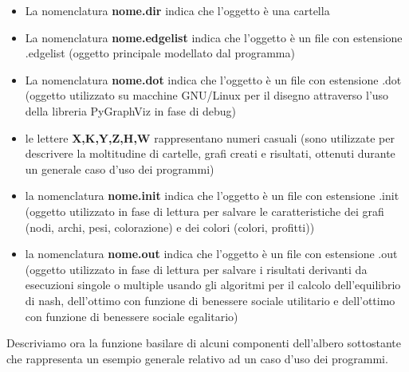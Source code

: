 \begin{itemize}
	\item La nomenclatura \textbf{nome.dir} indica che l'oggetto è una cartella
	\item La nomenclatura \textbf{nome.edgelist} indica che l'oggetto è un file con estensione .edgelist (oggetto principale modellato dal programma)
	\item La nomenclatura \textbf{nome.dot} indica che l'oggetto è un file con estensione .dot (oggetto utilizzato su macchine GNU/Linux per il disegno attraverso l'uso della libreria PyGraphViz in fase di debug)
	\item le lettere \textbf{X,K,Y,Z,H,W} rappresentano numeri casuali (sono utilizzate per descrivere la moltitudine di cartelle, grafi creati e risultati, ottenuti durante un generale caso d'uso dei programmi)
	\item la nomenclatura \textbf{nome.init} indica che l'oggetto è un file con estensione .init (oggetto utilizzato in fase di lettura per salvare le caratteristiche dei grafi (nodi, archi, pesi, colorazione) e dei colori (colori, profitti))
	\item la nomenclatura \textbf{nome.out} indica che l'oggetto è un file con estensione .out (oggetto utilizzato in fase di lettura per salvare i risultati derivanti da esecuzioni singole o multiple usando gli algoritmi per il calcolo dell'equilibrio di nash, dell'ottimo con funzione di benessere sociale utilitario e dell'ottimo con funzione di benessere sociale egalitario)
\end{itemize}

Descriviamo ora la funzione basilare di alcuni componenti dell'albero sottostante che rappresenta un esempio generale relativo ad un caso d'uso dei programmi.

